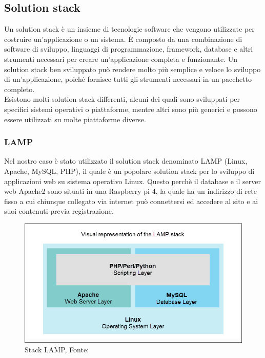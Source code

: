 \documentclass[a4paper,final,12pt]{report}
\begin{document}
\subsection{Solution stack}
Un solution stack è un insieme di tecnologie software che vengono utilizzate per costruire un'applicazione o un sistema. È composto da una combinazione di software di sviluppo, linguaggi di programmazione, framework, database e altri strumenti necessari per creare un'applicazione completa e funzionante.
Un solution stack ben sviluppato può rendere molto più semplice e veloce lo sviluppo di un'applicazione, poiché fornisce tutti gli strumenti necessari in un pacchetto completo.\\ 
Esistono molti solution stack differenti, alcuni dei quali sono sviluppati per specifici sistemi operativi o piattaforme, mentre altri sono più generici e possono essere utilizzati su molte piattaforme diverse.\\

\subsubsection{LAMP}
Nel nostro caso è stato utilizzato il solution stack denominato LAMP (Linux, Apache, MySQL, PHP), il quale è un popolare solution stack per lo sviluppo di applicazioni web su sistema operativo Linux. Questo perchè il database e il server web Apache2 sono situati in una Raspberry pi 4, la quale ha un indirizzo di rete fisso a cui chiunque collegato via internet può connettersi ed accedere al sito e ai suoi contenuti previa registrazione.
\begin{figure}[hbtp]
\centering
\includegraphics[scale=0.47]{img_concettuale/LAMP.png}
\caption{Stack LAMP, Fonte: \cite{phoenixnap}}

\end{figure} 
\end{document}
